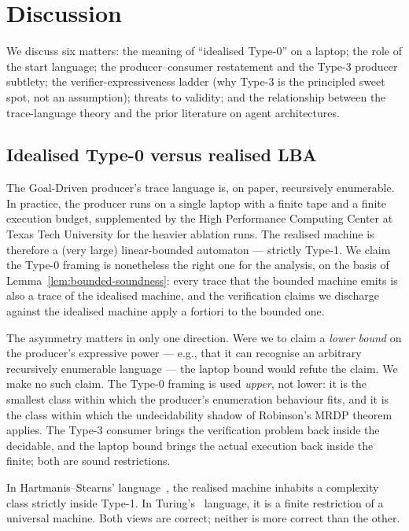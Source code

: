 \section{Discussion}
\label{sec:discussion}

We discuss six matters: the meaning of ``idealised Type-0'' on a
laptop; the role of the start language; the producer--consumer
restatement and the Type-3 producer subtlety; the verifier-expressiveness
ladder (why Type-3 is the principled sweet spot, not an assumption);
threats to validity; and the relationship between the trace-language
theory and the prior literature on agent architectures.

\subsection{Idealised Type-0 versus realised LBA}

The Goal-Driven producer's trace language is, on paper,
recursively enumerable.  In practice, the producer runs on a
single laptop with a finite tape and a finite execution budget,
supplemented by the High Performance Computing Center at
Texas Tech University for the heavier ablation runs.  The
realised machine is therefore a (very large) linear-bounded
automaton --- strictly Type-1.  We claim the Type-0 framing is
nonetheless the right one for the analysis, on the basis of
Lemma~\ref{lem:bounded-soundness}: every trace that the bounded
machine emits is also a trace of the idealised machine, and the
verification claims we discharge against the idealised machine
apply a fortiori to the bounded one.

The asymmetry matters in only one direction.  Were we to claim a
\emph{lower bound} on the producer's expressive power --- e.g.,
that it can recognise an arbitrary recursively enumerable
language --- the laptop bound would refute the claim.  We make
no such claim.  The Type-0 framing is used \emph{upper}, not
lower:  it is the smallest class within which the producer's
enumeration behaviour fits, and it is the class within which the
undecidability shadow of
Robinson's MRDP theorem~\cite{robinson1949definability,davis1961decision}
applies.  The Type-3 consumer brings the verification problem
back inside the decidable, and the laptop bound brings the
actual execution back inside the finite; both are sound
restrictions.

In Hartmanis--Stearns'
language~\cite{hartmanis1965computational}, the realised machine
inhabits a complexity class strictly inside Type-1.  In
Turing's~\cite{turing1936computable} language, it is a finite
restriction of a universal machine.  Both views are correct;
neither is more correct than the other.


